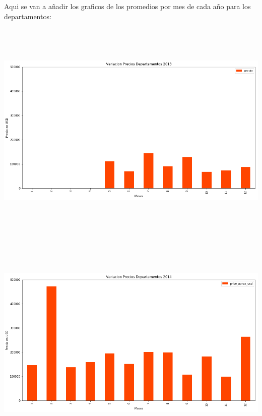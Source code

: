 \documentclass[a4paper, 10pt]{article}
\begin{document}
      Aqui se van a añadir los graficos de los promedios por mes de cada año para los departamentos:
      \begin{center}
            \includegraphics[width=6in, height=4.2in]{images/vDeptos2013}
      \end{center}
      \begin{center}
            \includegraphics[width=6in, height=4.2in]{images/vDeptos2014}
      \end{center}
\end{document}
